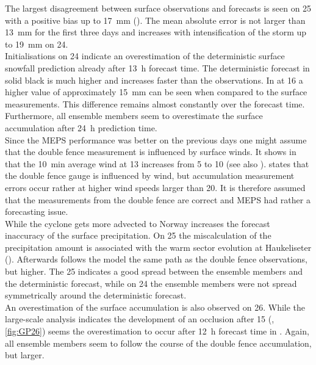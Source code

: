 The largest disagreement between surface observations and forecasts is seen on \SI{25}{\dec} with a positive bias up to \SI{17}{\mm} (). The mean absolute error is not larger than \SI{13}{\mm} for the first three days and increases with intensification of the storm up to \SI{19}{\mm} on \SI{24}{\dec}.
\\
Initialisations on \SI{24}{\dec} indicate an overestimation of the deterministic surface snowfall prediction already after \SI{13}{\hour} forecast time. The deterministic forecast in solid black is much higher and increases faster than the observations. In  at \SI{16}{\UTC} a higher value of approximately \SI{15}{\mm} can be seen when compared to the surface measurements. This difference remains almost constantly over the forecast time. Furthermore, all ensemble members seem to overestimate the surface accumulation after \SI{24}{\hour} prediction time. 
\\
Since the MEPS performance was better on the previous days one might assume that the double fence measurement is influenced by surface winds. It shows in  that the \SI{10}{\minute} average wind at \SI{13}{\UTC} increases from \SI{5}{\mPs} to \SI{10}{\mPs} (see also ). \citet[][unpublished]{wolff_wmo_2018} states that the double fence gauge is influenced by wind, but accumulation measurement errors occur rather at higher wind speeds larger than \SI{20}{\mPs}. It is therefore assumed that the measurements from the double fence are correct and MEPS had rather a forecasting issue.
\\
While the cyclone gets more advected to Norway increases the forecast inaccuracy of the surface precipitation. 
On \SI{25}{\dec} the miscalculation of the precipitation amount is associated with the warm sector evolution at Haukeliseter (). Afterwards follows the model the same path as the double fence observations, but higher. The \SI{25}{\dec} indicates a good spread between the ensemble members and the deterministic forecast, while on \SI{24}{\dec} the ensemble members were not spread symmetrically around the deterministic forecast. 
\\
An overestimation of the surface accumulation is also observed on \SI{26}{\dec}. While the large-scale analysis indicates the development of an occlusion after \SI{15}{\UTC} (, \ref{fig:GP26}) seems the overestimation to occur after \SI{12}{\hour} forecast time in . Again, all ensemble members seem to follow the course of the double fence accumulation, but larger. 
